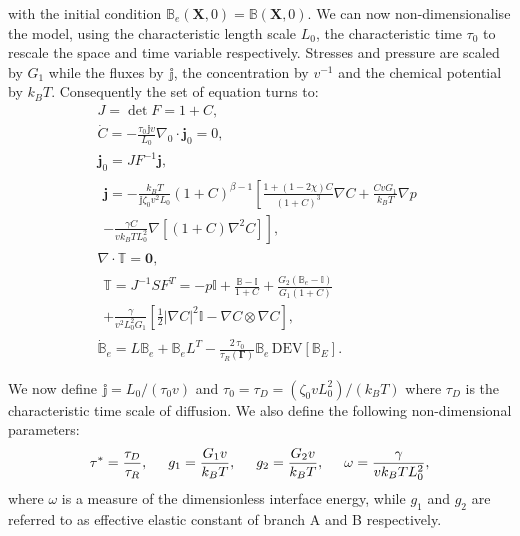 \documentclass[12pt]{extarticle}
\newcommand{\B}{\ensuremath{\mathbb{B}}}
\begin{document}
with the initial condition $\B_e(\mathbf{X},0)=\B(\mathbf{X},0)$.
We can now non-dimensionalise the model, using the characteristic length scale $L_0$, the characteristic time $\tau_0$ to rescale the space and time variable respectively. Stresses and pressure are scaled by $G_1$ while the fluxes by $\mathbb{j}$, the concentration by $v^{-1}$ and the chemical potential by $k_B T$. Consequently the set of equation turns to:
\begin{gather}
J=\det F=1+C,\\
\dot{C} = -\frac{\tau_0 \mathbb{j}v}{L_0} \nabla_0 \cdot \mathbf{j}_0 = 0,\\
\mathbf{j}_0= J F^{-1} \mathbf{j},\\[5mm]
\begin{aligned}
\mathbf{j} = -\frac{k_B T }{\mathbb{j}\zeta_0 v^2 L_0}\left(1+C\right)^{\beta-1}\left[ \frac{1+(1-2\chi)C}{(1+C)^3}\nabla C +\frac{CvG_1}{k_B T}\nabla p\right.\\
\left.- \frac{\gamma C}{vk_BTL_0^2}\nabla[(1+C)\nabla^2 C]\right],
\end{aligned}\\[5mm]
\nabla \cdot \mathbb{T} = \mathbf{0},\\[5mm]
\begin{aligned}
\mathbb{T} = J^{-1} SF^T = -p \mathbb{I} +\frac{\B-\mathbb{I}}{1+C} +\frac{G_2(\B_e-\mathbb{I})}{G_1(1+C)} \\
+ \frac{\gamma}{v^2 L_0^2 G_1}\left[\frac{1}{2} |\nabla C|^2\mathbb{I}-\nabla C \otimes \nabla C\right],
\end{aligned}\\[5mm]
\dot{\B}_e= L \B_e +\B_e L^T - \frac{2 \, \tau_0}{\tau_R(\boldsymbol{\Gamma})} \B_e \,\text{DEV}[\B_E].
\end{gather}

We now define $\mathbb{j}=L_0/(\tau_0 v)$ and $\tau_0=\tau_D=(\zeta_0 v L_0^2)/(k_B T)$ where $\tau_D$ is the characteristic time scale of diffusion. We also define the following non-dimensional parameters:
\begin{equation}
\tau^*= \frac{\tau_D}{\tau_R}, \hspace{5mm} g_1 = \frac{G_1v}{k_B T}, \hspace{5mm} g_2=\frac{G_2v}{k_BT},\hspace{5mm} \omega = \frac{\gamma}{v k_BTL^2_0},
\end{equation}
where $\omega$ is a measure of the dimensionless interface energy, while  $g_1$ and $g_2$ are referred to as effective elastic constant of branch A and B respectively.
\end{document}

